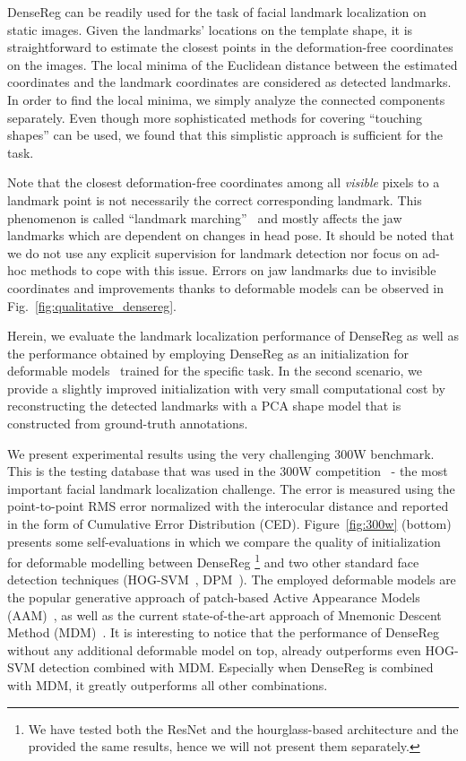 DenseReg can be readily used for the task of facial landmark localization on static images. Given the landmarks' locations on the template shape, it is straightforward to estimate the closest points in the deformation-free coordinates on the images. The local minima of the Euclidean distance between the estimated coordinates and the landmark coordinates are considered as detected landmarks. In order to find the local minima, we simply analyze the connected components separately. Even though more sophisticated methods for covering ``touching shapes'' can be used, we found that this simplistic approach is sufficient for the task. 

Note that the closest deformation-free coordinates among all \emph{visible} pixels to a landmark point is not necessarily the correct corresponding landmark. This phenomenon is called ``landmark marching''~\cite{zhu2015high} and mostly affects the jaw landmarks which are dependent on changes in head pose. It should be noted that we do not use any explicit supervision for landmark detection nor focus on ad-hoc methods to cope with this issue. Errors on jaw landmarks due to invisible coordinates and improvements thanks to deformable models can be observed in Fig.~\ref{fig:qualitative_densereg}.

Herein, we evaluate the landmark localization performance of DenseReg as well as the performance obtained by employing DenseReg as an initialization for deformable models~\cite{papandreou2008adaptive,tzimiropoulos2014gauss,antonakos2015feature,trigeorgis2016mnemonic} trained for the specific task. In the second scenario, we provide a slightly improved initialization with very small computational cost by reconstructing the detected landmarks with a PCA shape model that is constructed from ground-truth annotations. 


We present experimental results using the very challenging 300W benchmark. This is the testing database that was used in the 300W competition~\cite{sagonas_iccv_300w_2013,sagonas2016300} - the most important facial landmark localization challenge. The error is measured using the point-to-point RMS error normalized with the interocular distance and reported in the form of Cumulative Error Distribution (CED). Figure~\ref{fig:300w} (bottom) presents some self-evaluations in which we compare the quality of initialization for deformable modelling between DenseReg \footnote{We have tested both the ResNet and the hourglass-based architecture and the provided the same results, hence we will not present them separately.} and two other standard face detection techniques (HOG-SVM~\cite{king2015max}, DPM~\cite{mathias2014face}). The employed deformable models are the popular generative approach of patch-based Active Appearance Models (AAM)~\cite{papandreou2008adaptive,tzimiropoulos2014gauss,antonakos2015feature}, as well as the current state-of-the-art approach of Mnemonic Descent Method (MDM)~\cite{trigeorgis2016mnemonic}. It is interesting to notice that the performance of DenseReg without any additional deformable model on top, already outperforms even HOG-SVM detection combined with MDM. Especially when DenseReg is combined with MDM, it greatly outperforms all other combinations. 


